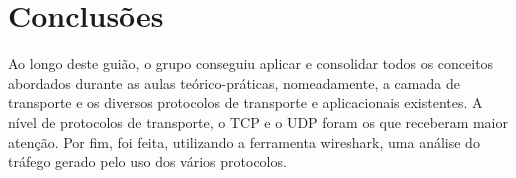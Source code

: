 \documentclass[a4paper]{article}
\begin{document}
\newpage
\section{Conclusões}

Ao longo deste guião, o grupo conseguiu aplicar e consolidar todos os conceitos abordados durante as aulas teórico-práticas, nomeadamente, a camada de transporte e os diversos protocolos de transporte e aplicacionais existentes.
A nível de protocolos de transporte, o TCP e o UDP foram os que receberam maior atenção.
Por fim, foi feita, utilizando a ferramenta wireshark, uma análise  do tráfego gerado pelo uso dos vários protocolos.
\end{document}
